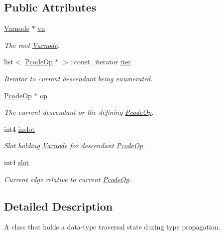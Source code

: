 \subsection*{Public Attributes}
\begin{DoxyCompactItemize}
\item 
\mbox{\hyperlink{class_varnode}{Varnode}} $\ast$ \mbox{\hyperlink{class_propagation_state_ad1e2aa7ef7c3650b04b4bf6541b009f4}{vn}}
\begin{DoxyCompactList}\small\item\em The root \mbox{\hyperlink{class_varnode}{Varnode}}. \end{DoxyCompactList}\item 
list$<$ \mbox{\hyperlink{class_pcode_op}{Pcode\+Op}} $\ast$ $>$\+::const\+\_\+iterator \mbox{\hyperlink{class_propagation_state_a215ac3517dbd555b90e371b4e0303eb3}{iter}}
\begin{DoxyCompactList}\small\item\em Iterator to current descendant being enumerated. \end{DoxyCompactList}\item 
\mbox{\hyperlink{class_pcode_op}{Pcode\+Op}} $\ast$ \mbox{\hyperlink{class_propagation_state_ae26bcb5e9e3ce711d1f973fd2d7c0e0c}{op}}
\begin{DoxyCompactList}\small\item\em The current descendant or the defining \mbox{\hyperlink{class_pcode_op}{Pcode\+Op}}. \end{DoxyCompactList}\item 
int4 \mbox{\hyperlink{class_propagation_state_a35ab65aa35ba4bad632d618d3b25d171}{inslot}}
\begin{DoxyCompactList}\small\item\em Slot holding \mbox{\hyperlink{class_varnode}{Varnode}} for descendant \mbox{\hyperlink{class_pcode_op}{Pcode\+Op}}. \end{DoxyCompactList}\item 
int4 \mbox{\hyperlink{class_propagation_state_a205db0b2b585fcb959667eb6745feec8}{slot}}
\begin{DoxyCompactList}\small\item\em Current edge relative to current \mbox{\hyperlink{class_pcode_op}{Pcode\+Op}}. \end{DoxyCompactList}\end{DoxyCompactItemize}


\subsection{Detailed Description}
A class that holds a data-\/type traversal state during type propagation. 

